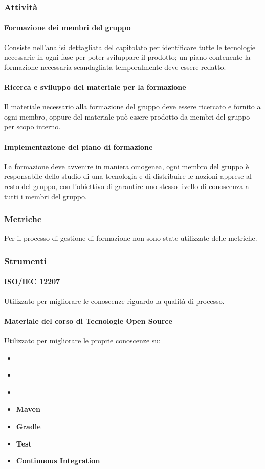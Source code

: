\subsubsection{Attività}

\paragraph{Formazione dei membri del gruppo}
Consiste nell'analisi dettagliata del capitolato per identificare tutte le tecnologie necessarie in ogni fase per poter sviluppare il prodotto; un piano contenente la formazione necessaria scandagliata temporalmente deve essere redatto.
\paragraph{Ricerca e sviluppo del materiale per la formazione} 
Il materiale necessario alla formazione del gruppo deve essere ricercato e fornito a ogni membro, oppure del materiale può essere prodotto da membri del gruppo per scopo interno.
\paragraph{Implementazione del piano di formazione} 
La formazione deve avvenire in maniera omogenea, ogni membro del gruppo è responsabile dello studio di una tecnologia e di distribuire le nozioni apprese al resto del gruppo, con l'obiettivo di garantire uno stesso livello di conoscenza a tutti i membri del gruppo.

\subsubsection{Metriche} 
Per il processo di gestione di formazione non sono state utilizzate delle metriche.

\subsubsection{Strumenti} 
\paragraph{ISO/IEC 12207}
Utilizzato per migliorare le conoscenze riguardo la qualità di processo.
\paragraph{Materiale del corso di Tecnologie Open Source}
Utilizzato per migliorare le proprie conoscenze su:
\begin{itemize}
	\item \textbf{}
	\item \textbf{}
	\item \textbf{}
	\item \textbf{Maven}
	\item \textbf{Gradle}
	\item \textbf{Test}
	\item \textbf{Continuous Integration}
\end{itemize}
